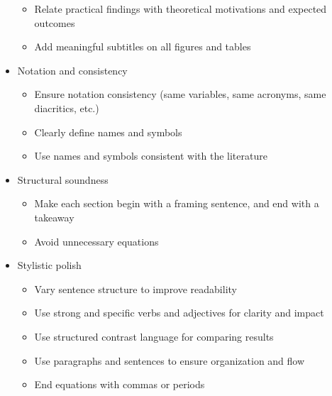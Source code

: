 \begin{itemize}
\begin{itemize}
		\item Relate practical findings with theoretical motivations and expected outcomes
		\item Add meaningful subtitles on all figures and tables
	\end{itemize}
	\item Notation and consistency
	\begin{itemize}
		\item Ensure notation consistency (same variables, same acronyms, same diacritics, etc.)
		\item Clearly define names and symbols
		\item Use names and symbols consistent with the literature
	\end{itemize}
	\item Structural soundness
	\begin{itemize}
		\item Make each section begin with a framing sentence, and end with a takeaway
		\item Avoid unnecessary equations
	\end{itemize}
	\item Stylistic polish
	\begin{itemize}
		\item Vary sentence structure to improve readability
		\item Use strong and specific verbs and adjectives for clarity and impact
		\item Use structured contrast language for comparing results
		\item Use paragraphs and sentences to ensure organization and flow
		\item End equations with commas or periods
	\end{itemize}
\end{itemize}

